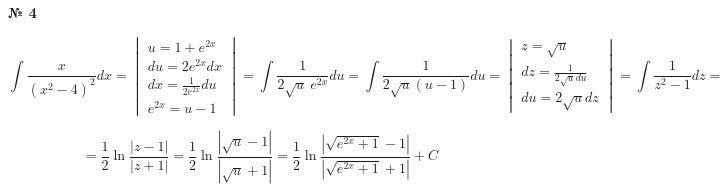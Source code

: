 \documentclass{article}
\begin{document}
\textbf{№ 4} 

$$ \int \frac{x}{(x^2-4)^2} dx 
= \begin{vmatrix} u = 1+e^{2x} \\
                 du = 2e^{2x}dx \\
                 dx = \frac{1}{2e^{2x}}du \\
             e^{2x} = u-1 \end{vmatrix} 
= \int \frac{1}{2\sqrt{u} \ e^{2x}}du
= \int \frac{1}{2\sqrt{u}(u-1)}du 
= \begin{vmatrix} z = \sqrt{u} \\
                 dz = \frac{1}{2\sqrt{u}du} \\
                 du = 2\sqrt{u}dz \end{vmatrix}
= \int \frac{1}{z^2-1}dz 
= $$

$$ = \frac{1}{2} \ln{\frac{\left| z-1 \right|}{\left| z+1 \right|}}
= \frac{1}{2} \ln{\frac{\left| \sqrt{u}-1 \right|}{\left| \sqrt{u}+1 \right|}} 
= \frac{1}{2} \ln{\frac{\left| \sqrt{e^{2x}+1}-1 \right|}{\left| \sqrt{e^{2x}+1}+1 \right|}} + C $$
\end{document}
